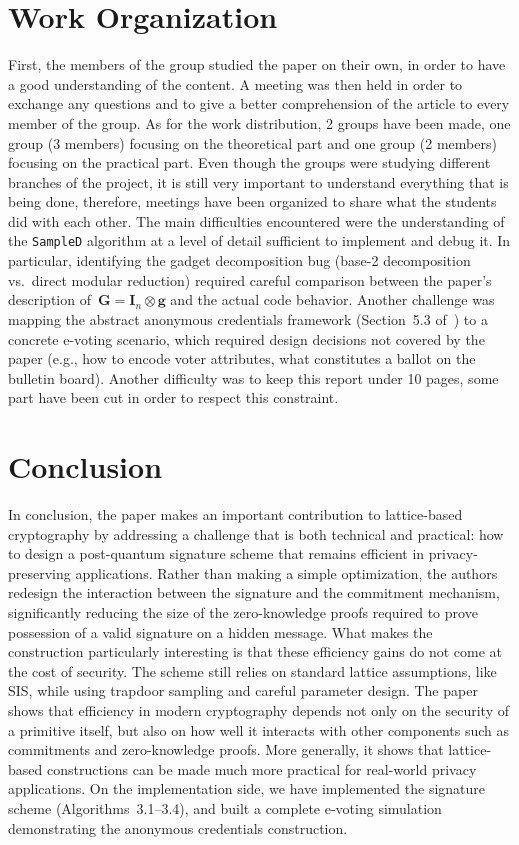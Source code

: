 \documentclass[a4paper]{article}
\begin{document}
\section{Work Organization}
First, the members of the group studied the paper on their own, in order to have a good understanding of the content.
A meeting was then held in order to exchange any questions and to give a better comprehension of the article to every member of the group.
As for the work distribution, 2 groups have been made, one group (3 members) focusing on the theoretical part and one group (2 members) focusing on
the practical part. Even though the groups were studying different branches of the project, it is still very important to understand
everything that is being done, therefore, meetings have been organized to share what the students did with each other.
The main difficulties encountered were the understanding of the \texttt{SampleD} algorithm at a level of detail sufficient to implement and debug it. In particular, identifying the gadget decomposition bug (base-2 decomposition vs.\ direct modular reduction) required careful comparison between the paper's description of~$\mathbf{G} = \mathbf{I}_n \otimes \mathbf{g}$ and the actual code behavior. Another challenge was mapping the abstract anonymous credentials framework (Section~5.3 of~\cite{mainPaper}) to a concrete e-voting scenario, which required design decisions not covered by the paper (e.g., how to encode voter attributes, what constitutes a ballot on the bulletin board).
Another difficulty was to keep this report under 10 pages, some part have been cut in order to respect this constraint. 

\section{Conclusion}

In conclusion, the paper makes an important contribution to lattice-based cryptography by addressing a challenge that is both technical and practical: how to design a post-quantum signature scheme that remains efficient in privacy-preserving applications. Rather than making a simple optimization, the authors redesign the interaction between the signature and the commitment mechanism, significantly reducing the size of the zero-knowledge proofs required to prove possession of a valid signature on a hidden message.
What makes the construction particularly interesting is that these efficiency gains do not come at the cost of security. The scheme still relies on standard lattice assumptions, like SIS, while using trapdoor sampling and careful parameter design. The paper shows that efficiency in modern cryptography depends not only on the security of a primitive itself, but also on how well it interacts with other components such as commitments and zero-knowledge proofs. More generally, it shows that lattice-based constructions can be made much more practical for real-world privacy applications.
On the implementation side, we have implemented the signature scheme (Algorithms~3.1--3.4), and built a complete e-voting simulation demonstrating the anonymous credentials construction.

\printbibliography
\end{document}
